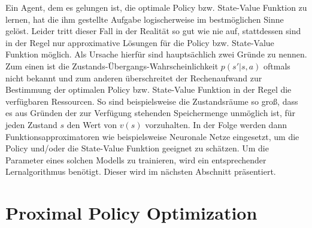 Ein Agent, dem es gelungen ist, die optimale Policy bzw. State-Value Funktion zu lernen, hat die ihm gestellte Aufgabe logischerweise im bestmöglichen Sinne gelöst. Leider tritt dieser Fall in der Realität so gut wie nie auf, stattdessen sind in der Regel nur approximative Lösungen für die Policy bzw. State-Value Funktion möglich. Als Ursache hierfür sind hauptsächlich zwei Gründe zu nennen. Zum einen ist die Zustands-Übergangs-Wahrscheinlichkeit $p(s'|s,a)$ oftmals nicht bekannt und zum anderen überschreitet der Rechenaufwand zur Bestimmung der optimalen Policy bzw. State-Value Funktion in der Regel die verfügbaren Ressourcen. So sind beispielsweise die Zustandsräume so groß, dass es aus Gründen der zur Verfügung stehenden Speichermenge unmöglich ist, für jeden Zustand $s$ den Wert von $v(s)$ vorzuhalten. In der Folge werden dann Funktionsapproximatoren wie beispielsweise Neuronale Netze eingesetzt, um die Policy und/oder die State-Value Funktion geeignet zu schätzen. Um die Parameter eines solchen Modells zu trainieren, wird ein entsprechender Lernalgorithmus benötigt. Dieser wird im nächsten Abschnitt präsentiert.


\section{Proximal Policy Optimization}
\label{sec_ppo}

